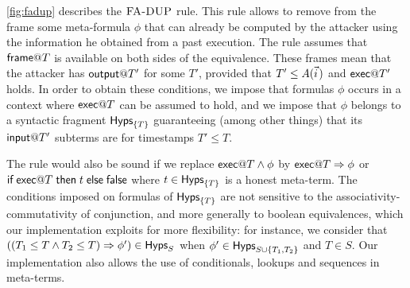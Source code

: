 \cref{fig:fadup} describes the  $\textsc{FA-DUP}$ rule.
This rule allows to remove from the frame some meta-formula
$\phi$ that can already be computed by the attacker
using the information he obtained from a past execution.
The rule assumes that $\textsf{frame} @ T$ is available
on both sides of the equivalence. These frames mean that the
attacker has $\textsf{output} @ T'$ for some $T'$, provided that $T' \leq A(\pvec i)$
and $\textsf{exec} @ T'$ holds.
In order to obtain these conditions, we impose that formulas $\phi$
occurs in a context where $\textsf{exec} @ T$ can be assumed to hold,
and we impose that $\phi$ belongs to a syntactic fragment $\textsf{Hyps}_{\{T\}}$
guaranteeing (among other things)
that its $\textsf{input} @ T'$ subterms are for timestamps $T' \leq T$.

The rule would also be sound if we replace $\textsf{exec} @ T \wedge \phi$
by $\textsf{exec} @ T \Rightarrow \phi$ or
$\textsf{if}\; \textsf{exec} @ T \;\textsf{then}\; t \;\textsf{else}\; \textsf{false}$ where $t \in \textsf{Hyps}_{\{T\}}$
is a honest meta-term.
The conditions imposed on formulas of $\textsf{Hyps}_{\{T\}}$ are not sensitive
to the associativity-commutativity of conjunction, and more generally
to boolean equivalences, which our implementation exploits for more
flexibility: for instance, we consider that
$((T_1 \leq T \wedge T_2 \leq T) \Rightarrow \phi') \in \textsf{Hyps}_S$
when
$\phi' \in \textsf{Hyps}_{S \cup \{T_1,T_2\}}$ and $T \in S$.
Our implementation also allows the use of conditionals, lookups and
sequences in meta-terms.

